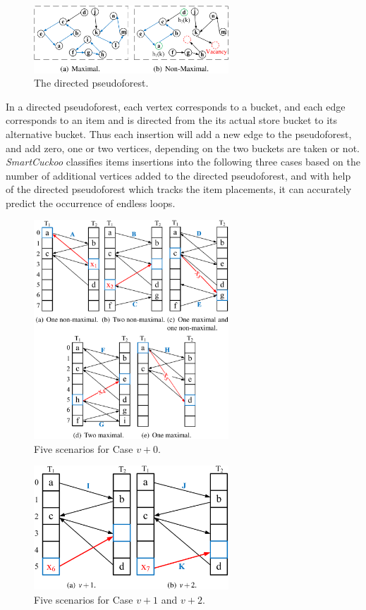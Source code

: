 \documentclass[runningheads]{llncs}
\begin{document}
\begin{figure}
    \centering
    \includegraphics[width=0.65\textwidth]{maximal-graph.png}
    \caption{The directed pseudoforest.} \label{fig:maximal-graph}
\end{figure}

In a directed pseudoforest, each vertex corresponds to a bucket, and each edge corresponds to an item and is directed from the its actual store bucket to its alternative bucket. Thus each insertion will add a new edge to the pseudoforest, and add zero, one or two vertices, depending on the two buckets are taken or not.  \textit{SmartCuckoo} classifies items insertions into the following three cases based on the number of additional vertices added to the directed pseudoforest, and with help of the directed pseudoforest which tracks the item placements, it can accurately predict the occurrence of endless loops.

\begin{figure}
    \centering
    \includegraphics[width=0.65\textwidth]{v+0.png}
    \caption{Five scenarios for Case $v+0$.} \label{fig:v+0}
\end{figure}

\begin{figure}
    \centering
    \includegraphics[width=0.65\textwidth]{v+1-2.png}
    \caption{Five scenarios for Case $v+1$ and $v+2$.} \label{fig:v+1-2}
\end{figure}
\end{document}
